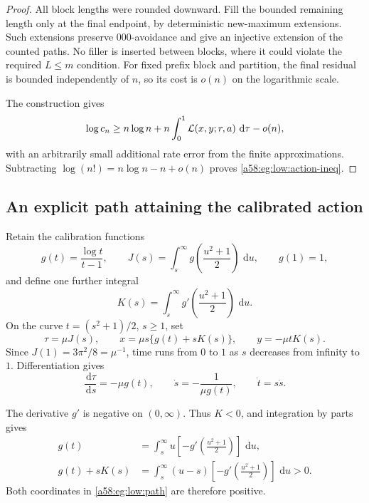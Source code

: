 \documentclass[11pt,letterpaper]{article}
\theoremstyle{remark}
\newcommand{\egdd}{\,\mathrm d}
\newcommand{\muval}{\mu}
\begin{document}
\begin{proof}
All block lengths were rounded downward. Fill the bounded remaining
length only at the final endpoint, by deterministic new-maximum
extensions. Such extensions preserve \(000\)-avoidance and give an
injective extension of the counted paths. No filler is inserted
between blocks, where it could violate the required \(L\le m\)
condition. For fixed prefix block and partition, the final residual
is bounded independently of \(n\), so its cost is \(o(n)\) on the
logarithmic scale.

The construction gives
\[
 \log c_n\ge n\log n+
 n\int_0^1{\cal L}(x,y;r,a)\,\egdd\tau-o(n),
\]
with an arbitrarily small additional rate error from the finite
approximations. Subtracting
\(\log(n!)=n\log n-n+o(n)\) proves \eqref{a58:eg:low:action-ineq}.
\end{proof}

\subsection{An explicit path attaining the calibrated action}

Retain the calibration functions
\[
 g(t)=\frac{\log t}{t-1},\qquad
 J(s)=\int_s^\infty g\!\left(\frac{u^2+1}{2}\right)\,\egdd u,
 \qquad g(1)=1,
\]
and define one further integral
\begin{equation}\label{a58:eg:low:K}
 K(s)=\int_s^\infty
          g'\!\left(\frac{u^2+1}{2}\right)\,\egdd u.
\end{equation}
On the curve \(t=(s^2+1)/2\), \(s\ge1\), set
\begin{equation}\label{a58:eg:low:path}
 \tau=\muval J(s),\qquad
 x=\muval s\{g(t)+sK(s)\},\qquad
 y=-\muval tK(s).
\end{equation}
Since \(J(1)=3\pi^2/8=\muval^{-1}\), time runs from \(0\) to \(1\)
as \(s\) decreases from infinity to \(1\). Differentiation gives
\begin{equation}\label{a58:eg:low:time-derivatives}
 \frac{\egdd\tau}{\egdd s}=-\muval g(t),\qquad
 \dot s=-\frac1{\muval g(t)},\qquad \dot t=s\dot s.
\end{equation}

The derivative \(g'\) is negative on \((0,\infty)\).
Thus \(K<0\), and integration by parts gives
\begin{align}
 g(t)&=\int_s^\infty
      u\left[-g'\!\left(\frac{u^2+1}{2}\right)\right]\,\egdd u,
      \label{a58:eg:low:g-integral}\\
 g(t)+sK(s)&=\int_s^\infty
      (u-s)\left[-g'\!\left(\frac{u^2+1}{2}\right)\right]\,\egdd u>0.
      \label{a58:eg:low:positive-x}
\end{align}
Both coordinates in \eqref{a58:eg:low:path} are therefore positive.
\end{document}

